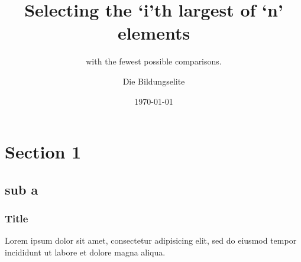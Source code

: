 \documentclass{beamer}
\title{Selecting the `i'th largest of `n' elements}
\subtitle{with the fewest possible comparisons.}
\author{Die Bildungselite}
\institute{FMI - University of Stuttgart}
\date{\today}
\begin{document}
\begin{frame}
    \titlepage
\end{frame}

\section{Section 1}
\subsection{sub a}

\begin{frame}
    \frametitle{Title}
    Lorem ipsum dolor sit amet, consectetur adipisicing elit, sed do eiusmod tempor incididunt ut labore et dolore magna aliqua.
\end{frame}
\end{document}
